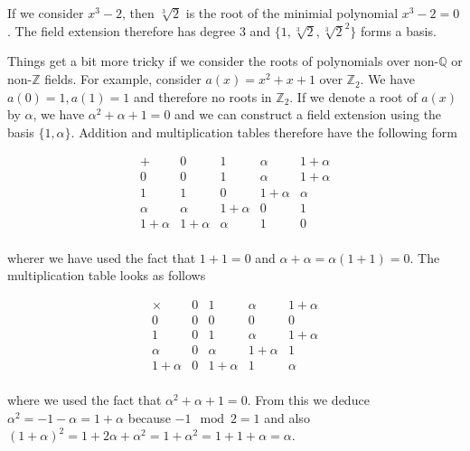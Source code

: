 If we consider \(x^3-2\), then \(\sqrt[3]{2}\) is the root of the
minimial polynomial \(x^3-2 = 0\). The field extension therefore has
degree 3 and \(\{1, \sqrt[3]{2}, \sqrt[3]{2}^2\}\) forms a basis.

Things get a bit more tricky if we consider the roots of polynomials
over non-\(\mathbb{Q}\) or non-\(\mathbb{Z}\) fields. For example,
consider \(a(x) = x^2+x+1\) over \(\mathbb{Z}_2\). We have
\(a(0) = 1, a(1)=1\) and therefore no roots in \(\mathbb{Z}_2\). If we
denote a root of \(a(x)\) by \(\alpha\), we have \(\alpha^2+\alpha+1=0\)
and we can construct a field extension using the basis
\(\{1, \alpha\}\). Addition and multiplication tables therefore have the
following form

\[
\begin{array}{c|cccc}
+  &       0        & 1          & \alpha     & 1+\alpha \\
\hline
0 &        0        & 1          & \alpha     & 1+\alpha \\
1 &        1        & 0          & 1 + \alpha & \alpha   \\
\alpha &   \alpha   & 1 + \alpha & 0          & 1        \\
1+\alpha & 1+\alpha & \alpha     & 1          & 0        \\
\end{array}
\]

wherer we have used the fact that \(1 + 1 = 0\) and
\(\alpha + \alpha = \alpha (1+1) = 0\). The multiplication table looks
as follows

\[
\begin{array}{c|cccc}
\times  &    0        & 1        & \alpha     & 1+\alpha \\
\hline
0 &        0        & 0        & 0          & 0 \\
1 &        0        & 1        & \alpha     & 1 + \alpha   \\
\alpha &   0        & \alpha   & 1 + \alpha & 1        \\ 
1+\alpha & 0        &1+\alpha &  1  &        \alpha      \\
\end{array}
\]

where we used the fact that \(\alpha^2 + \alpha +1 =0\). From this we
deduce \(\alpha^2=-1-\alpha = 1 + \alpha\) because \(-1 \mod 2 =1\) and
also
\((1+\alpha)^2 = 1 + 2\alpha + \alpha^2 = 1 + \alpha^2 = 1 + 1 + \alpha = \alpha\).
